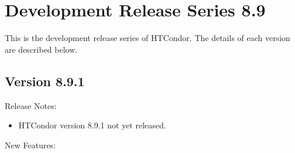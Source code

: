 
\section{Development Release Series 8.9}\label{sec:History-8-9}

This is the development release series of HTCondor.
The details of each version are described below.

\subsection*{\label{sec:New-8-9-1}Version 8.9.1}

\noindent Release Notes:

\begin{itemize}

\item HTCondor version 8.9.1 not yet released.

\end{itemize}


\noindent New Features:

